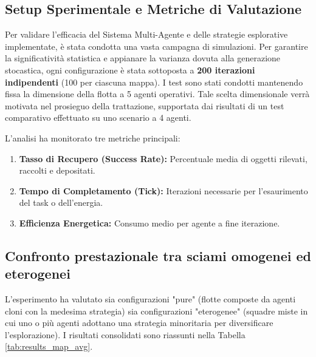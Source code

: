 \documentclass[11pt,a4paper]{article}
\begin{document}
\subsection{Setup Sperimentale e Metriche di Valutazione}
Per validare l'efficacia del Sistema Multi-Agente e delle strategie esplorative implementate, è stata condotta una vasta campagna di simulazioni. Per garantire la significatività statistica e appianare la varianza dovuta alla generazione stocastica, ogni configurazione è stata sottoposta a \textbf{200 iterazioni indipendenti} (100 per ciascuna mappa). I test sono stati condotti mantenendo fissa la dimensione della flotta a 5 agenti operativi. Tale scelta dimensionale verrà motivata nel prosieguo della trattazione, supportata dai risultati di un test comparativo effettuato su uno scenario a 4 agenti.

L'analisi ha monitorato tre metriche principali:
\begin{enumerate}
    \item \textbf{Tasso di Recupero (Success Rate):} Percentuale media di oggetti rilevati, raccolti e depositati.
    \item \textbf{Tempo di Completamento (Tick):} Iterazioni necessarie per l'esaurimento del task o dell'energia.
    \item \textbf{Efficienza Energetica:} Consumo medio per agente a fine iterazione.
\end{enumerate}

\subsection{Confronto prestazionale tra sciami omogenei ed eterogenei}
L'esperimento ha valutato sia configurazioni "pure" (flotte composte da agenti cloni con la medesima strategia) sia configurazioni "eterogenee" (squadre miste in cui uno o più agenti adottano una strategia minoritaria per diversificare l'esplorazione). I risultati consolidati sono riassunti nella Tabella \ref{tab:results_map_avg}.
\end{document}
